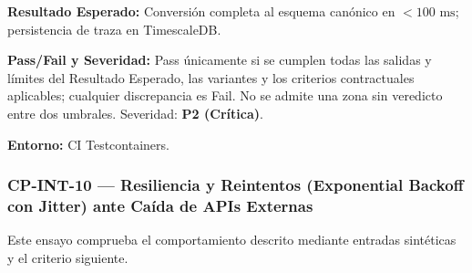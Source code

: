 \par\noindent\textbf{Resultado Esperado:} Conversión completa al esquema canónico en \(< 100\text{ ms}\); persistencia de traza en TimescaleDB.\par
\par\noindent\textbf{Pass/Fail y Severidad:} Pass únicamente si se cumplen todas las salidas y límites del Resultado Esperado, las variantes y los criterios contractuales aplicables; cualquier discrepancia es Fail. No se admite una zona sin veredicto entre dos umbrales. Severidad: \textbf{P2 (Crítica)}.\par
\par\noindent\textbf{Entorno:} CI Testcontainers.\par






\subsubsection*{CP-INT-10 — Resiliencia y Reintentos (Exponential Backoff con Jitter) ante Caída de APIs Externas}\label{sec:9-cp-int-10}
Este ensayo comprueba el comportamiento descrito mediante entradas sintéticas y el criterio siguiente.

